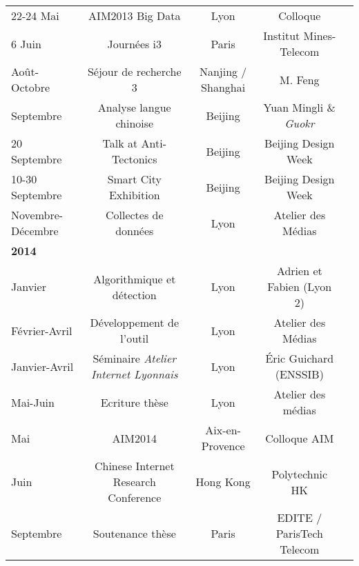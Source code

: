 {\begin{table}[h!]
\begin{tabulary}{\linewidth}{ l C C C C}
    22-24 Mai & 
    AIM2013 Big Data  &
    Lyon & 
    Colloque \\

    6 Juin & 
    Journées i3 &
    Paris & 
    Institut Mines-Telecom \\

    Août-Octobre & 
    Séjour de recherche 3 &
    Nanjing / Shanghai & 
    M.  Feng \\

    Septembre & 
    Analyse langue chinoise  &
    Beijing & 
    Yuan Mingli \& \textit{Guokr} \\

    20 Septembre & 
    Talk at Anti-Tectonics  &
    Beijing & 
    Beijing Design Week \\

    10-30 Septembre & 
    Smart City Exhibition  &
    Beijing & 
    Beijing Design Week \\

    Novembre-Décembre  & 
    Collectes de données   &
    Lyon & 
    Atelier des Médias \\

    \textbf{2014}  & & & \\

    Janvier & 
    Algorithmique et détection  &
    Lyon & 
    Adrien  et Fabien  (Lyon 2)\\

    Février-Avril & 
    Développement de l'outil  &
    Lyon & 
    Atelier des Médias \\

    Janvier-Avril & 
    Séminaire \textit{Atelier Internet Lyonnais}  &
    Lyon & 
    \'Eric Guichard (ENSSIB) \\

    Mai-Juin & 
    Ecriture thèse  &
    Lyon & 
    Atelier des médias \\

    Mai & 
    AIM2014  &
    Aix-en-Provence & 
    Colloque AIM \\

    Juin & 
    Chinese Internet Research Conference  &
    Hong Kong & 
    Polytechnic HK \\

    Septembre & 
    Soutenance thèse  &
    Paris & 
    EDITE / ParisTech Telecom \\
\end{tabulary}
\end{table}}





